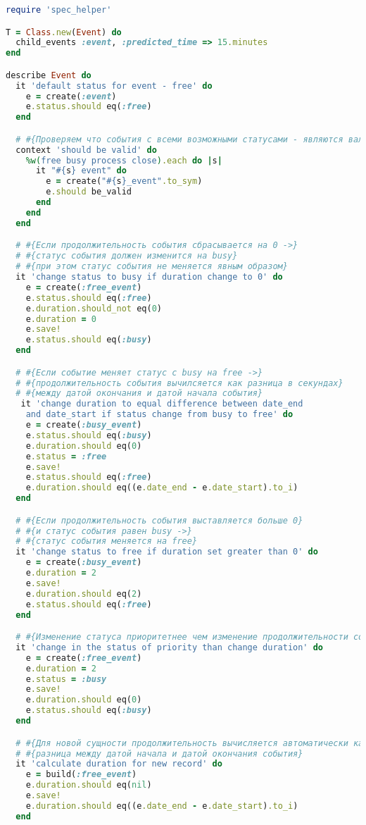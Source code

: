 
\begin{lstlisting}[language=Ruby] 
require 'spec_helper'

T = Class.new(Event) do
  child_events :event, :predicted_time => 15.minutes
end

describe Event do
  it 'default status for event - free' do
    e = create(:event)
    e.status.should eq(:free)
  end

  # #{Проверяем что события с всеми возможными статусами - являются валидными}
  context 'should be valid' do
    %w(free busy process close).each do |s|
      it "#{s} event" do
        e = create("#{s}_event".to_sym)
        e.should be_valid
      end
    end
  end

  # #{Если продолжительность события сбрасывается на 0 ->}
  # #{статус события должен изменится на busy} 
  # #{при этом статус события не меняется явным образом}
  it 'change status to busy if duration change to 0' do
    e = create(:free_event)
    e.status.should eq(:free)
    e.duration.should_not eq(0)
    e.duration = 0
    e.save!
    e.status.should eq(:busy)
  end

  # #{Если событие меняет статус с busy на free ->}
  # #{продолжительность события вычилсяется как разница в секундах} 
  # #{между датой окончания и датой начала события}
   it 'change duration to equal difference between date_end
    and date_start if status change from busy to free' do
    e = create(:busy_event)
    e.status.should eq(:busy)
    e.duration.should eq(0)
    e.status = :free
    e.save!
    e.status.should eq(:free)
    e.duration.should eq((e.date_end - e.date_start).to_i)
  end

  # #{Если продолжительность события выставляется больше 0} 
  # #{и статус события равен busy ->} 
  # #{статус события меняется на free}
  it 'change status to free if duration set greater than 0' do
    e = create(:busy_event)
    e.duration = 2
    e.save!
    e.duration.should eq(2)
    e.status.should eq(:free)
  end

  # #{Изменение статуса приоритетнее чем изменение продолжительности события}
  it 'change in the status of priority than change duration' do
    e = create(:free_event)
    e.duration = 2
    e.status = :busy
    e.save!
    e.duration.should eq(0)
    e.status.should eq(:busy)
  end

  # #{Для новой сущности продолжительность вычисляется автоматически как} 
  # #{разница между датой начала и датой окончания события}
  it 'calculate duration for new record' do
    e = build(:free_event)
    e.duration.should eq(nil)
    e.save!
    e.duration.should eq((e.date_end - e.date_start).to_i)
  end


\end{lstlisting}
